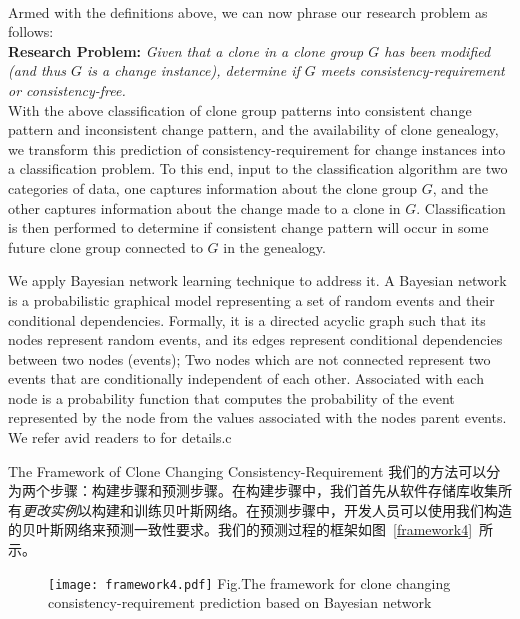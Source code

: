 ~\\
Armed with the definitions above, we can now phrase our research problem as follows:  \\

\noindent
\textbf{Research Problem:} {\em Given that a clone in a clone group $G$ has been modified (and thus $G$ is a change instance), determine if $G$ meets consistency-requirement or consistency-free.} \\


With the above classification of clone group patterns into consistent change pattern and inconsistent change pattern, and the availability of clone genealogy, we transform this prediction of consistency-requirement for change instances into a classification problem. 
To this end, input to the classification algorithm are two categories of data, one captures information about the clone group $G$, and the other captures information about the change made to a clone in $G$. 
Classification is then performed to determine if consistent change pattern will occur in some future clone group connected to $G$ in the genealogy. 

We apply Bayesian network learning technique to address it. 
A Bayesian network is a probabilistic graphical model representing a set of random events and their conditional dependencies. 
Formally, it is a directed acyclic graph such that its nodes represent random events, and its edges represent conditional dependencies between two nodes (events); Two nodes which are not connected represent two events that are conditionally independent of each other.
Associated with each node is a probability function that computes the probability of the event represented by the node from the values associated with the nodes parent events. 
We refer avid readers to \cite{Pearl1985} for details.c


{The Framework of Clone Changing Consistency-Requirement}
我们的方法可以分为两个步骤：构建步骤和预测步骤。在构建步骤中，我们首先从软件存储库收集所有{\em 更改实例}以构建和训练贝叶斯网络。在预测步骤中，开发人员可以使用我们构造的贝叶斯网络来预测一致性要求。我们的预测过程的框架如图~\ref{framework4}~所示。

\begin{figure}[htbp]
\centering
\texttt{[image: framework4.pdf]}
{Fig.$\!$}{The framework for clone changing consistency-requirement prediction based on Bayesian network}
\vspace{-1em}
\end{figure}

